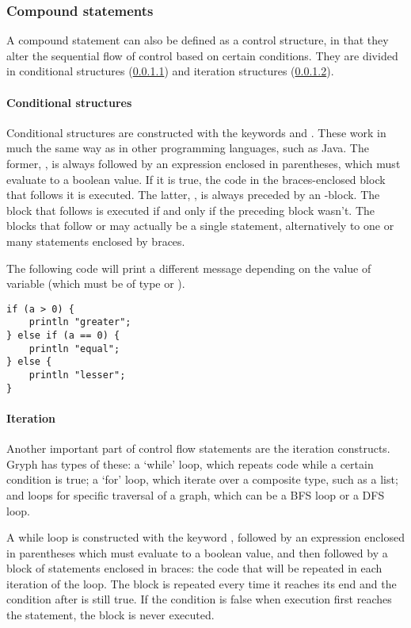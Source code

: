 \subsubsection{Compound statements}
\label{sec:compound-stmts}
A compound statement can also be defined as a control structure, in that they alter the sequential flow of control based on certain conditions. They are divided in conditional structures (\ref{sec:conditional}) and iteration structures (\ref{sec:iteration}).

\paragraph{Conditional structures}
\label{sec:conditional}
Conditional structures are constructed with the keywords  and . These work in much the same way as in other programming languages, such as Java. The former, , is always followed by an expression enclosed in parentheses, which must evaluate to a boolean value. If it is true, the code in the braces-enclosed block that follows it is executed. The latter, , is always preceded by an -block. The block that follows  is executed if and only if the preceding block wasn't. The blocks that follow  or  may actually be a single statement, alternatively to one or many statements enclosed by braces.

The following code will print a different message depending on the value of variable  (which must be of type  or ).
\begin{lstlisting}[language=Gryph]
if (a > 0) {
	println "greater";
} else if (a == 0) {
	println "equal";
} else {
	println "lesser";
}
\end{lstlisting}

\paragraph{Iteration}
\label{sec:iteration}
Another important part of control flow statements are the iteration constructs. Gryph has types of these: a `while' loop, which repeats code while a certain condition is true; a `for' loop, which iterate over a composite type, such as a list; and loops for specific traversal of a graph, which can be a BFS loop or a DFS loop.

A while loop is constructed with the keyword , followed by an expression enclosed in parentheses which must evaluate to a boolean value, and then followed by a block of statements enclosed in braces: the code that will be repeated in each iteration of the loop. The block is repeated every time it reaches its end and the condition after  is still true. If the condition is false when execution first reaches the  statement, the block is never executed.

